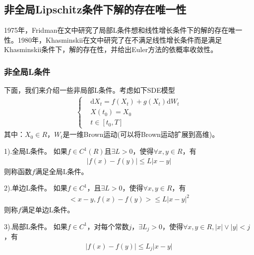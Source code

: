     \subsection{非全局Lipschitz条件下解的存在唯一性}
        \label{subsec:非全局Lipschitz条件下解的存在唯一性}
        \par
        1975年，Fridman在文\cite{1975.Fridman}中研究了局部L条件想和线性增长条件下的解的存在唯一性。1980年，Khasminskii在文\cite{1980.Khasminskii}中研究了在不满足线性增长条件而是满足Khasminskii条件下，解的存在性，并给出Euler方法的依概率收敛性。
        \subsubsection{非全局L条件}
            \label{subsubsec:非全局L条件}
            \par
            下面，我们来介绍一些非局部L条件。考虑如下SDE模型
            \begin{align*}
                \left\{
                    \begin{aligned}
                    &\mathrm{d}X_t = f(X_t ) + g(X_t) \mathrm{d}W_t\\
                    &X(t_0) = X_0\\
                    &t\in [t_0,T]
                    \end{aligned}
                \right.
            \end{align*}
            其中：$X_0\in R$，$W_t$是一维Brown运动(可以将Brown运动扩展到高维)。
            \par
            1).全局L条件。
            如果$f\in C^1(R)$且$\exists L >0$，使得$\forall x,y \in R$，有
            \begin{align*}
                |f(x) - f(y)  | \leqslant L|x-y|
            \end{align*}
            则称函数$f$满足全局L条件。
            \par
            2).单边L条件。
            如果$f \in C^1$，且$\exists L>0$，使得$\forall x,y\in R$，有
            \begin{align*}
                \bigl<x-y,f(x) - f(y)\bigr> \leqslant L|x-y|^2
            \end{align*}
            则称$f$满足单边L条件。
            \par
            3).局部L条件。
            如果$f\in C^1$，对每个常数$j$，$\exists L_j >0$，使得$\forall x,y \in R,|x|\vee |y|<j$，有
            \begin{align*}
                |f(x) - f(y) | \leqslant L_j |x-y|
            \end{align*}
